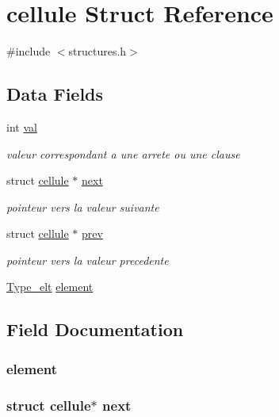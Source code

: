 \hypertarget{structcellule}{\section{cellule Struct Reference}
\label{structcellule}
}


{\ttfamily \#include $<$structures.\-h$>$}

\subsection*{Data Fields}
\begin{DoxyCompactItemize}
\item 
int \hyperlink{structcellule_aa0ccb5ee6d882ee3605ff47745c6467b}{val}
\begin{DoxyCompactList}\small\item\em valeur correspondant a une arrete ou une clause \end{DoxyCompactList}\item 
struct \hyperlink{structcellule}{cellule} $\ast$ \hyperlink{structcellule_a9b13de1721046063fd61e7656e0b7822}{next}
\begin{DoxyCompactList}\small\item\em pointeur vers la valeur suivante \end{DoxyCompactList}\item 
struct \hyperlink{structcellule}{cellule} $\ast$ \hyperlink{structcellule_aa3f0f03704e6715898722d969a262a9c}{prev}
\begin{DoxyCompactList}\small\item\em pointeur vers la valeur precedente \end{DoxyCompactList}\item 
\hyperlink{const_8h_a014e284005945c0522422e7bdd7f5eed}{Type\-\_\-elt} \hyperlink{structcellule_aa1f578f02f245dadfecbbcc523960163}{element}
\end{DoxyCompactItemize}


\subsection{Field Documentation}
\hypertarget{structcellule_aa1f578f02f245dadfecbbcc523960163}{
\subsubsection[{element}]{ element}}\label{structcellule_aa1f578f02f245dadfecbbcc523960163}
\hypertarget{structcellule_a9b13de1721046063fd61e7656e0b7822}{
\subsubsection[{next}]{\setlength{\rightskip}{0pt plus 5cm}struct {\bf cellule}$\ast$ next}}\label{structcellule_a9b13de1721046063fd61e7656e0b7822}


